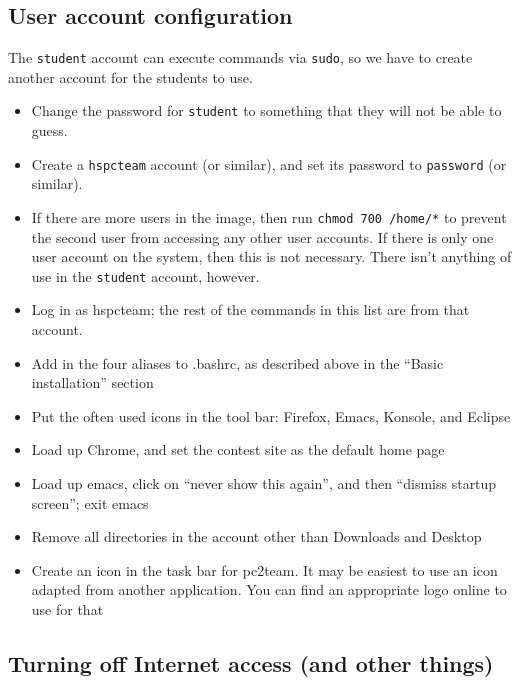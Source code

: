 \subsection*{User account configuration}

The {\tt student} account can execute commands via {\tt sudo}, so we
have to create another account for the students to use.

\begin{itemize}
  \tightlist
\item Change the password for {\tt student} to something that they will not be able to guess.
  \item Create a {\tt hspcteam} account (or similar), and set its password
    to {\tt password} (or similar).
\item
  If there are more users in the image, then run \texttt{chmod\ 700\ /home/*} to
  prevent the second user from accessing any other user accounts.  If
  there is only one user account on the system, then this is not
  necessary.  There isn't anything of use in the {\tt student}
  account, however.
\item Log in as hspcteam; the rest of the commands in this list are from
    that account.
\item
  Add in the four aliases to .bashrc, as described above in the ``Basic
  installation'' section
\item
  Put the often used icons in the tool bar: Firefox, Emacs,
  Konsole, and Eclipse
\item
  Load up Chrome, and set the contest site as the default
  home page
\item
  Load up emacs, click on ``never show this again'', and then ``dismiss
  startup screen''; exit emacs
\item
  Remove all directories in the account other than Downloads and Desktop
\item
  Create an icon in the task bar for pc2team.  It may be easiest to
  use an icon adapted from another application.  You can find an
  appropriate logo
  online to use for that
\end{itemize}

\subsection*{Turning off Internet access (and other things)}

